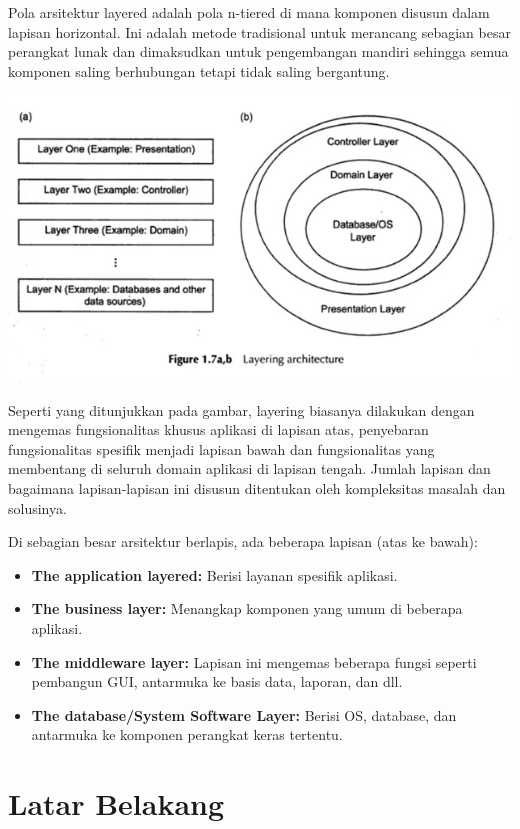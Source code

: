 \documentclass[a4paper,12pt]{article}
\begin{document}
Pola arsitektur layered adalah pola n-tiered di mana komponen disusun dalam lapisan horizontal. Ini adalah metode tradisional untuk merancang sebagian besar perangkat lunak dan dimaksudkan untuk pengembangan mandiri sehingga semua komponen saling berhubungan tetapi tidak saling bergantung.

\includegraphics{Img/Layering Architecture.jpg}

Seperti yang ditunjukkan pada gambar, layering biasanya dilakukan dengan mengemas fungsionalitas khusus aplikasi di lapisan atas, penyebaran fungsionalitas spesifik menjadi lapisan bawah dan fungsionalitas yang membentang di seluruh domain aplikasi di lapisan tengah. Jumlah lapisan dan bagaimana lapisan-lapisan ini disusun ditentukan oleh kompleksitas masalah dan solusinya.

Di sebagian besar arsitektur berlapis, ada beberapa lapisan (atas ke bawah):

\begin{itemize}
	\item \textbf{The application layered:} Berisi layanan spesifik aplikasi.
	\item \textbf{The business layer:} Menangkap komponen yang umum di beberapa aplikasi.
	\item \textbf{The middleware layer:} Lapisan ini mengemas beberapa fungsi seperti pembangun GUI, antarmuka ke basis data, laporan, dan dll.
	\item \textbf{The database/System Software Layer:} Berisi OS, database, dan antarmuka ke komponen perangkat keras tertentu.
\end{itemize}

\section*{Latar Belakang}
\end{document}
